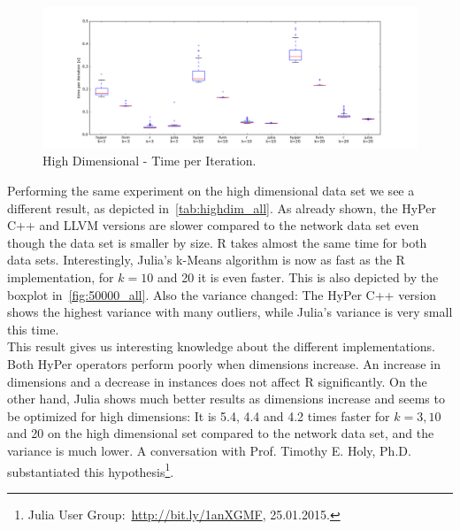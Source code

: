 \begin{figure}[htsb]
  \centerline{
  \includegraphics[scale=0.4, trim="0cm 1cm 0cm 0cm"]{figures/charts/50000_all}
  }
  \caption[High Dimensional - Time per Iteration]{High Dimensional - Time per Iteration.}
  \label{fig:50000_all}
\end{figure}



Performing the same experiment on the high dimensional data set we see a different result, as depicted in~\autoref{tab:highdim_all}. As already shown, the HyPer C++ and LLVM versions are slower compared to the network data set even though the data set is smaller by size. R takes almost the same time for both data sets. Interestingly, Julia’s k-Means algorithm is now as fast as the R implementation, for $k = 10$ and 20 it is even faster. This is also depicted by the boxplot in~\autoref{fig:50000_all}. Also the variance changed: The HyPer C++ version shows the highest variance with many outliers, while Julia's variance is very small this time.   
\\
This result gives us interesting knowledge about the different implementations. Both HyPer operators perform poorly when dimensions increase. An increase in dimensions and a decrease in instances does not affect R significantly. On the other hand, Julia shows much better results as dimensions increase and seems to be optimized for high dimensions: It is 5.4, 4.4 and 4.2 times faster for $k = 3, 10$ and 20 on the high dimensional set compared to the network data set, and the variance is much lower. A conversation with Prof. Timothy E. Holy, Ph.D. substantiated this hypothesis\footnote{Julia User Group:~\url{http://bit.ly/1anXGMF}, 25.01.2015.}. 

